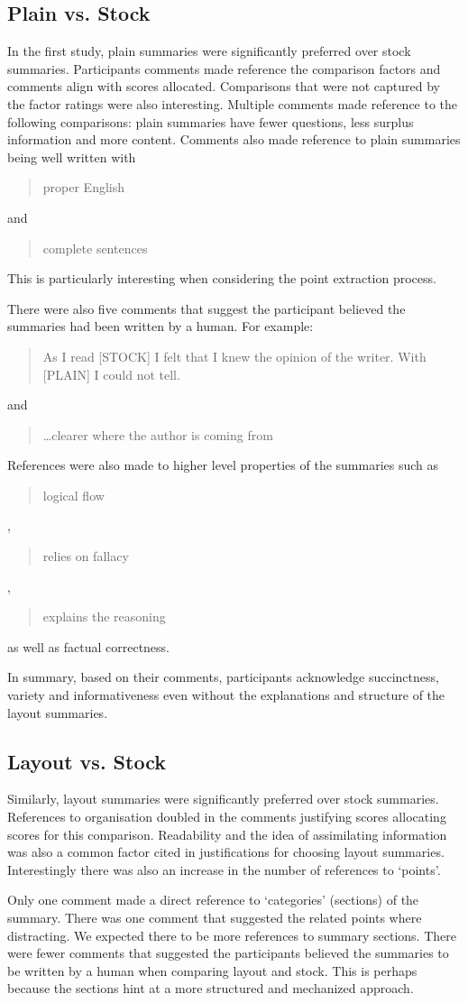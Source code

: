     \tocless\subsection{Plain vs. Stock}
      In the first study, plain summaries were significantly preferred over stock summaries. Participants comments made reference the comparison factors and comments align with scores allocated. Comparisons that were not captured by the factor ratings were also interesting. Multiple comments made reference to the following comparisons: plain summaries have fewer questions, less surplus information and more content. Comments also made reference to plain summaries being well written with \blockquote{proper English} and \blockquote{complete sentences}. This is particularly interesting when considering the point extraction process.

      There were also five comments that suggest the participant believed the summaries had been written by a human. For example: \blockquote{As I read [STOCK] I felt that I knew the opinion of the writer. With [PLAIN] I could not tell.} and \blockquote{\dots clearer where the author is coming from}. References were also made to higher level properties of the summaries such as \blockquote{logical flow}, \blockquote{relies on fallacy}, \blockquote{explains the reasoning} as well as factual correctness.

      In summary, based on their comments, participants acknowledge succinctness, variety and informativeness even without the explanations and structure of the layout summaries.

    \tocless\subsection{Layout vs. Stock}
      Similarly, layout summaries were significantly preferred over stock summaries. References to organisation doubled in the comments justifying scores allocating scores for this comparison. Readability and the idea of assimilating information was also a common factor cited in justifications for choosing layout summaries. Interestingly there was also an increase in the number of references to `points'.

      Only one comment made a direct reference to `categories' (sections) of the summary. There was one comment that suggested the related points where distracting. We expected there to be more references to summary sections. There were fewer comments that suggested the participants believed the summaries to be written by a human when comparing layout and stock. This is perhaps because the sections hint at a more structured and mechanized approach.

